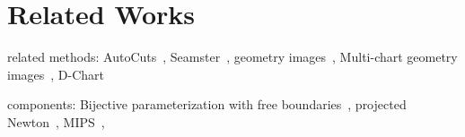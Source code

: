 \section{Related Works}

related methods:
AutoCuts~\cite{Poranne2017Autocuts},
Seamster~\cite{Sheffer2002Seamster},
geometry images~\cite{Gu2002Geometry},
Multi-chart geometry images~\cite{Snyder2003Multi},
D-Chart~\cite{Julius2005D}


components:
Bijective parameterization with free boundaries~\cite{Smith2015Bijective},
projected Newton~\cite{Teran2005Robust},
MIPS~\cite{Hormann2000MIPS},